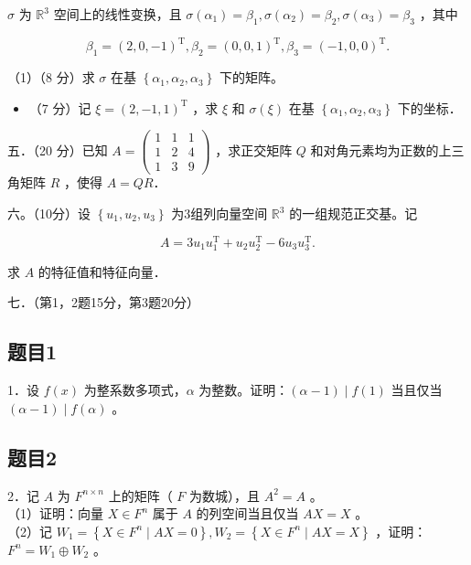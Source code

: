 \documentclass{article}
\begin{document}
\(\sigma\) 为 \(\mathbb{R}^{3}\) 空间上的线性变换，且 \(\sigma\left(\alpha_{1}\right)=\beta_{1}, \sigma\left(\alpha_{2}\right)=\beta_{2}, \sigma\left(\alpha_{3}\right)=\beta_{3}\) ，其中

\[
\beta_{1}=(2,0,-1)^{\mathrm{T}}, \beta_{2}=(0,0,1)^{\mathrm{T}}, \beta_{3}=(-1,0,0)^{\mathrm{T}} .
\]

（1）（8 分）求 \(\sigma\) 在基 \(\left\{\alpha_{1}, \alpha_{2}, \alpha_{3}\right\}\) 下的矩阵。

\begin{itemize}
  \item[（2）] （7 分）记 \(\xi=(2,-1,1)^{\mathrm{T}}\) ，求 \(\xi\) 和 \(\sigma(\xi)\) 在基 \(\left\{\alpha_{1}, \alpha_{2}, \alpha_{3}\right\}\) 下的坐标．
\end{itemize}

五．（20 分）已知 \(A=\left(\begin{array}{lll}1 & 1 & 1 \\ 1 & 2 & 4 \\ 1 & 3 & 9\end{array}\right)\) ，求正交矩阵 \(Q\) 和对角元素均为正数的上三角矩阵 \(R\) ，使得 \(A=Q R\)．

六。（10分）设 \(\left\{u_{1}, u_{2}, u_{3}\right\}\) 为3组列向量空间 \(\mathbb{R}^{3}\) 的一组规范正交基。记

\[
A=3 u_{1} u_{1}^{\mathrm{T}}+u_{2} u_{2}^{\mathrm{T}}-6 u_{3} u_{3}^{\mathrm{T}} .
\]

求 \(A\) 的特征值和特征向量．

七．（第1，2题15分，第3题20分）\\

\subsection{题目1}
1．设 \(f(x)\) 为整系数多项式，\(\alpha\) 为整数。证明：\((\alpha-1) \mid f(1)\) 当且仅当 \((\alpha-1) \mid f(\alpha)\) 。\\

\subsection{题目2}
2．记 \(A\) 为 \(F^{n \times n}\) 上的矩阵（ \(F\) 为数城），且 \(A^{2}=A\) 。\\
（1）证明：向量 \(X \in F^{n}\) 属于 \(A\) 的列空间当且仅当 \(A X=X\) 。\\
（2）记 \(W_{1}=\left\{X \in F^{n} \mid A X=0\right\}, W_{2}=\left\{X \in F^{n} \mid A X=X\right\}\) ，证明：\(F^{n}=W_{1} \oplus W_{2}\) 。\\
\end{document}

